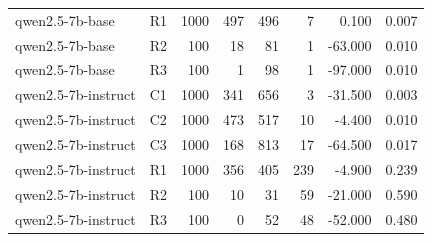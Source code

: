 \begin{table}
\begin{tabular}{llrrrrrr}
qwen2.5-7b-base & R1 & 1000 & 497 & 496 & 7 & 0.100 & 0.007 \\
qwen2.5-7b-base & R2 & 100 & 18 & 81 & 1 & -63.000 & 0.010 \\
qwen2.5-7b-base & R3 & 100 & 1 & 98 & 1 & -97.000 & 0.010 \\
qwen2.5-7b-instruct & C1 & 1000 & 341 & 656 & 3 & -31.500 & 0.003 \\
qwen2.5-7b-instruct & C2 & 1000 & 473 & 517 & 10 & -4.400 & 0.010 \\
qwen2.5-7b-instruct & C3 & 1000 & 168 & 813 & 17 & -64.500 & 0.017 \\
qwen2.5-7b-instruct & R1 & 1000 & 356 & 405 & 239 & -4.900 & 0.239 \\
qwen2.5-7b-instruct & R2 & 100 & 10 & 31 & 59 & -21.000 & 0.590 \\
qwen2.5-7b-instruct & R3 & 100 & 0 & 52 & 48 & -52.000 & 0.480 \\
\bottomrule
\end{tabular}
\end{table}
